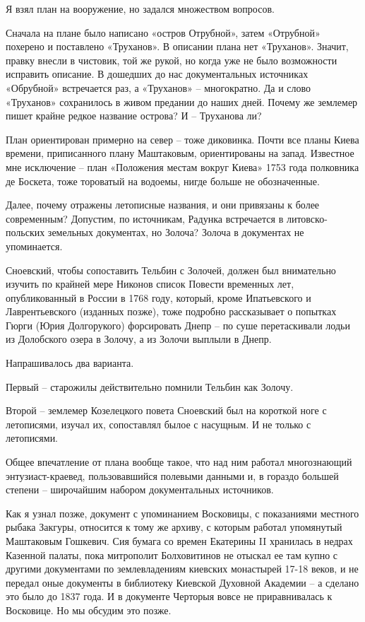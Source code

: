Я взял план на вооружение, но задался множеством вопросов.

Сначала на плане было написано «остров Отрубной», затем «Отрубной» похерено и поставлено «Труханов». В описании плана нет «Труханов». Значит, правку внесли в чистовик, той же рукой, но когда уже не было возможности исправить описание. В дошедших до нас документальных источниках «Обрубной» встречается раз, а «Труханов» – многократно. Да и слово «Труханов» сохранилось в живом предании до наших дней. Почему же землемер пишет крайне редкое название острова? И – Труханова ли?

План ориентирован примерно на север – тоже диковинка. Почти все планы Киева времени, приписанного плану Маштаковым, ориентированы на запад. Известное мне исключение – план «Положения местам вокруг Киева» 1753 года полковника де Боскета, тоже тороватый на водоемы, нигде больше не обозначенные.

Далее, почему отражены летописные названия, и они привязаны к более современным? Допустим, по источникам, Радунка встречается в литовско-польских земельных документах, но Золоча? Золоча в документах не упоминается.

Сноевский, чтобы сопоставить Тельбин с Золочей, должен был внимательно изучить по крайней мере Никонов список Повести временных лет, опубликованный в России в 1768 году, который, кроме Ипатьевского и Лаврентьевского (изданных позже), тоже подробно рассказывает о попытках Гюрги (Юрия Долгорукого) форсировать Днепр – по суше перетаскивали лодьи из Долобского озера в Золочу, а из Золочи выплыли в Днепр.

Напрашивалось два варианта. 

Первый – старожилы действительно помнили Тельбин как Золочу. 

Второй – землемер Козелецкого повета Сноевский был на короткой ноге с летописями, изучал их, сопоставлял былое с насущным. И не только с летописями. 

Общее впечатление от плана вообще такое, что над ним работал многознающий энтузиаст-краевед, пользовавшийся полевыми данными и, в гораздо большей степени – широчайшим набором документальных источников. 

Как я узнал позже, документ с упоминанием Восковицы, с показаниями местного рыбака Закгуры, относится к тому же архиву, с которым работал упомянутый Маштаковым Гошкевич. Сия бумага со времен Екатерины II хранилась в недрах Казенной палаты, пока митрополит Болховитинов не отыскал ее там купно с другими документами по землевладениям киевских монастырей 17-18 веков, и не передал оные документы в библиотеку Киевской Духовной Академии – а сделано это было до 1837 года. И в документе Черторыя вовсе не приравнивалась к Восковице. Но мы обсудим это позже.
  
